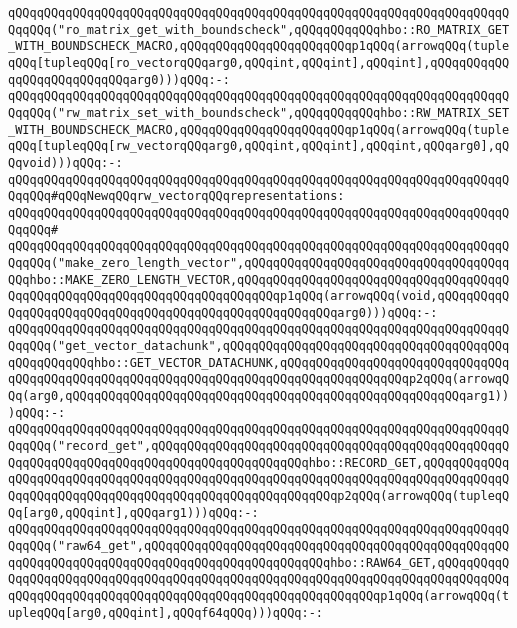 \verb|qQQqqQQqqQQqqQQqqQQqqQQqqQQqqQQqqQQqqQQqqQQqqQQqqQQqqQQqqQQqqQQqqQQqqQQqqQQq("ro_matrix_get_with_boundscheck",qQQqqQQqqQQqhbo::RO_MATRIX_GET_WITH_BOUNDSCHECK_MACRO,qQQqqQQqqQQqqQQqqQQqqQQqp1qQQq(arrowqQQq(tupleqQQq[tupleqQQq[ro_vectorqQQqarg0,qQQqint,qQQqint],qQQqint],qQQqqQQqqQQqqQQqqQQqqQQqqQQqarg0)))qQQq:-:|\newline
\verb|qQQqqQQqqQQqqQQqqQQqqQQqqQQqqQQqqQQqqQQqqQQqqQQqqQQqqQQqqQQqqQQqqQQqqQQqqQQq("rw_matrix_set_with_boundscheck",qQQqqQQqqQQqhbo::RW_MATRIX_SET_WITH_BOUNDSCHECK_MACRO,qQQqqQQqqQQqqQQqqQQqqQQqp1qQQq(arrowqQQq(tupleqQQq[tupleqQQq[rw_vectorqQQqarg0,qQQqint,qQQqint],qQQqint,qQQqarg0],qQQqvoid)))qQQq:-:|\newline
\newline
\verb|qQQqqQQqqQQqqQQqqQQqqQQqqQQqqQQqqQQqqQQqqQQqqQQqqQQqqQQqqQQqqQQqqQQqqQQqqQQq#qQQqNewqQQqrw_vectorqQQqrepresentations:|\newline
\verb|qQQqqQQqqQQqqQQqqQQqqQQqqQQqqQQqqQQqqQQqqQQqqQQqqQQqqQQqqQQqqQQqqQQqqQQqqQQq#|\newline
\verb|qQQqqQQqqQQqqQQqqQQqqQQqqQQqqQQqqQQqqQQqqQQqqQQqqQQqqQQqqQQqqQQqqQQqqQQqqQQq("make_zero_length_vector",qQQqqQQqqQQqqQQqqQQqqQQqqQQqqQQqqQQqqQQqhbo::MAKE_ZERO_LENGTH_VECTOR,qQQqqQQqqQQqqQQqqQQqqQQqqQQqqQQqqQQqqQQqqQQqqQQqqQQqqQQqqQQqqQQqqQQqqQQqqQQqp1qQQq(arrowqQQq(void,qQQqqQQqqQQqqQQqqQQqqQQqqQQqqQQqqQQqqQQqqQQqqQQqqQQqqQQqarg0)))qQQq:-:|\newline
\verb|qQQqqQQqqQQqqQQqqQQqqQQqqQQqqQQqqQQqqQQqqQQqqQQqqQQqqQQqqQQqqQQqqQQqqQQqqQQq("get_vector_datachunk",qQQqqQQqqQQqqQQqqQQqqQQqqQQqqQQqqQQqqQQqqQQqqQQqqQQqhbo::GET_VECTOR_DATACHUNK,qQQqqQQqqQQqqQQqqQQqqQQqqQQqqQQqqQQqqQQqqQQqqQQqqQQqqQQqqQQqqQQqqQQqqQQqqQQqqQQqqQQqqQQqp2qQQq(arrowqQQq(arg0,qQQqqQQqqQQqqQQqqQQqqQQqqQQqqQQqqQQqqQQqqQQqqQQqqQQqqQQqarg1)))qQQq:-:|\newline
\verb|qQQqqQQqqQQqqQQqqQQqqQQqqQQqqQQqqQQqqQQqqQQqqQQqqQQqqQQqqQQqqQQqqQQqqQQqqQQq("record_get",qQQqqQQqqQQqqQQqqQQqqQQqqQQqqQQqqQQqqQQqqQQqqQQqqQQqqQQqqQQqqQQqqQQqqQQqqQQqqQQqqQQqqQQqqQQqhbo::RECORD_GET,qQQqqQQqqQQqqQQqqQQqqQQqqQQqqQQqqQQqqQQqqQQqqQQqqQQqqQQqqQQqqQQqqQQqqQQqqQQqqQQqqQQqqQQqqQQqqQQqqQQqqQQqqQQqqQQqqQQqqQQqqQQqqQQqp2qQQq(arrowqQQq(tupleqQQq[arg0,qQQqint],qQQqarg1)))qQQq:-:|\newline
\verb|qQQqqQQqqQQqqQQqqQQqqQQqqQQqqQQqqQQqqQQqqQQqqQQqqQQqqQQqqQQqqQQqqQQqqQQqqQQq("raw64_get",qQQqqQQqqQQqqQQqqQQqqQQqqQQqqQQqqQQqqQQqqQQqqQQqqQQqqQQqqQQqqQQqqQQqqQQqqQQqqQQqqQQqqQQqqQQqqQQqhbo::RAW64_GET,qQQqqQQqqQQqqQQqqQQqqQQqqQQqqQQqqQQqqQQqqQQqqQQqqQQqqQQqqQQqqQQqqQQqqQQqqQQqqQQqqQQqqQQqqQQqqQQqqQQqqQQqqQQqqQQqqQQqqQQqqQQqqQQqqQQqp1qQQq(arrowqQQq(tupleqQQq[arg0,qQQqint],qQQqf64qQQq)))qQQq:-:|\newline
